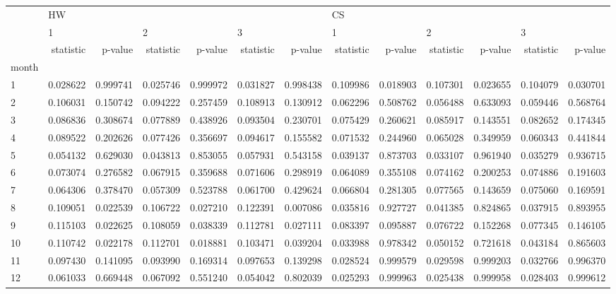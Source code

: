 \begin{tabular}{lrrrrrrrrrrrr}
\toprule
{} & \multicolumn{6}{l}{HW} & \multicolumn{6}{l}{CS} \\
{} & \multicolumn{2}{l}{1} & \multicolumn{2}{l}{2} & \multicolumn{2}{l}{3} & \multicolumn{2}{l}{1} & \multicolumn{2}{l}{2} & \multicolumn{2}{l}{3} \\
{} & statistic &   p-value & statistic &   p-value & statistic &   p-value & statistic &   p-value & statistic &   p-value & statistic &   p-value \\
month &           &           &           &           &           &           &           &           &           &           &           &           \\
\midrule
1     &  0.028622 &  0.999741 &  0.025746 &  0.999972 &  0.031827 &  0.998438 &  0.109986 &  0.018903 &  0.107301 &  0.023655 &  0.104079 &  0.030701 \\
2     &  0.106031 &  0.150742 &  0.094222 &  0.257459 &  0.108913 &  0.130912 &  0.062296 &  0.508762 &  0.056488 &  0.633093 &  0.059446 &  0.568764 \\
3     &  0.086836 &  0.308674 &  0.077889 &  0.438926 &  0.093504 &  0.230701 &  0.075429 &  0.260621 &  0.085917 &  0.143551 &  0.082652 &  0.174345 \\
4     &  0.089522 &  0.202626 &  0.077426 &  0.356697 &  0.094617 &  0.155582 &  0.071532 &  0.244960 &  0.065028 &  0.349959 &  0.060343 &  0.441844 \\
5     &  0.054132 &  0.629030 &  0.043813 &  0.853055 &  0.057931 &  0.543158 &  0.039137 &  0.873703 &  0.033107 &  0.961940 &  0.035279 &  0.936715 \\
6     &  0.073074 &  0.276582 &  0.067915 &  0.359688 &  0.071606 &  0.298919 &  0.064089 &  0.355108 &  0.074162 &  0.200253 &  0.074886 &  0.191603 \\
7     &  0.064306 &  0.378470 &  0.057309 &  0.523788 &  0.061700 &  0.429624 &  0.066804 &  0.281305 &  0.077565 &  0.143659 &  0.075060 &  0.169591 \\
8     &  0.109051 &  0.022539 &  0.106722 &  0.027210 &  0.122391 &  0.007086 &  0.035816 &  0.927727 &  0.041385 &  0.824865 &  0.037915 &  0.893955 \\
9     &  0.115103 &  0.022625 &  0.108059 &  0.038339 &  0.112781 &  0.027111 &  0.083397 &  0.095887 &  0.076722 &  0.152268 &  0.077345 &  0.146105 \\
10    &  0.110742 &  0.022178 &  0.112701 &  0.018881 &  0.103471 &  0.039204 &  0.033988 &  0.978342 &  0.050152 &  0.721618 &  0.043184 &  0.865603 \\
11    &  0.097430 &  0.141095 &  0.093990 &  0.169314 &  0.097653 &  0.139298 &  0.028524 &  0.999579 &  0.029598 &  0.999203 &  0.032766 &  0.996370 \\
12    &  0.061033 &  0.669448 &  0.067092 &  0.551240 &  0.054042 &  0.802039 &  0.025293 &  0.999963 &  0.025438 &  0.999958 &  0.028403 &  0.999612 \\
\bottomrule
\end{tabular}

